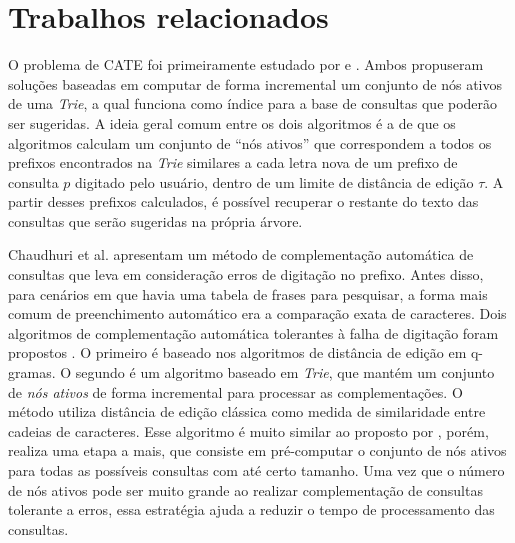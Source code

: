 \section{Trabalhos relacionados}\label{sec:referencias}
\label{sec:related_work}

O problema de CATE foi primeiramente estudado por \cite{chaudhuri2009extending} e \cite{ji2009efficient}. Ambos propuseram soluções baseadas em computar de forma incremental um conjunto de nós ativos de uma \textit{Trie}, a qual funciona como índice para a base de consultas que poderão ser sugeridas. A ideia geral comum entre os dois algoritmos é a de que os algoritmos calculam um conjunto de ``nós ativos'' que correspondem a todos os prefixos encontrados na \textit{Trie} similares a cada letra nova de um prefixo de consulta $p$ digitado pelo usuário, dentro de um limite de distância de edição $\tau$. A partir desses prefixos calculados, é possível recuperar o restante do texto das consultas que serão sugeridas na própria árvore.

Chaudhuri et al. \cite{chaudhuri2009extending} apresentam um método de complementação automática de consultas que leva em consideração erros de digitação no prefixo. Antes disso, para cenários em que havia uma tabela de frases para pesquisar, a forma mais comum de preenchimento automático era a comparação exata de caracteres. Dois algoritmos de complementação automática tolerantes à falha de digitação foram propostos \citep{chaudhuri2009extending}. O primeiro é baseado nos algoritmos de distância de edição em q-gramas\citep{arasu2006efficient, chaudhuri2006primitive, xiao2008ed}. O segundo é um algoritmo baseado em \textit{Trie}, que mantém um conjunto de \textit{nós ativos} de forma incremental para processar as complementações. O método utiliza distância de edição clássica como medida de similaridade entre cadeias de caracteres. Esse algoritmo é muito similar ao proposto por \cite{ji2009efficient}, porém, realiza uma etapa a mais, que consiste em pré-computar o conjunto de nós ativos para todas as possíveis consultas com até certo tamanho. Uma vez que o número de nós ativos pode ser muito grande ao realizar complementação de consultas tolerante a erros, essa estratégia ajuda a reduzir o tempo de processamento das consultas.


